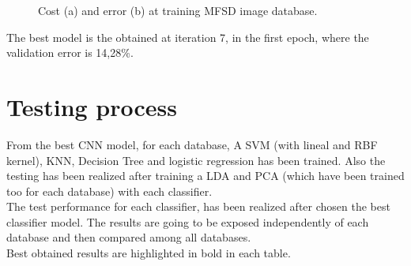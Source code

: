 \begin{figure}[htb]
\centering
\caption{Cost (a) and error (b) at training MFSD image database.}
\label{fig:ejecucion2_mfsd_train}
\end{figure}

The best model is the obtained at iteration 7, in the first epoch, where the validation error is 14,28\%.\\

\section{Testing process}
From the best CNN model, for each database, A SVM (with lineal and RBF kernel), KNN, Decision Tree and logistic regression has been trained. Also the testing has been realized after training a LDA and PCA (which have been trained too for each database) with each classifier.\\

The test performance for each classifier, has been realized after chosen the best classifier model.  The results are going to be exposed independently of each database and then compared among all databases.\\

Best obtained results are highlighted in bold in each table.\\

